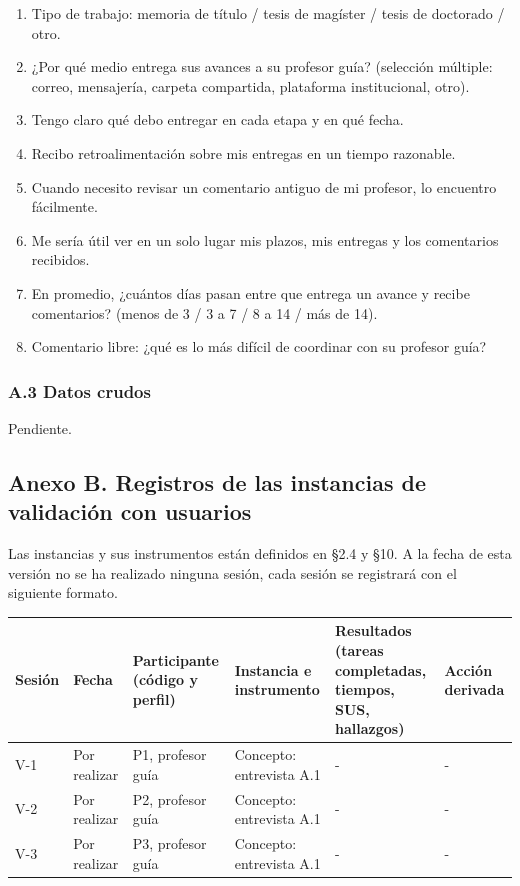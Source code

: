 \documentclass[10pt,a4paper]{article}
\newcommand{\hrow}{\rowcolor{encabezado}}
\newcommand{\h}[1]{\textbf{#1}}
\newcommand{\ph}[1]{{\color{nota}#1}}
\begin{document}
\begin{enumerate}[leftmargin=18pt,itemsep=1pt,topsep=2pt]
  \item Tipo de trabajo: memoria de título / tesis de magíster / tesis de doctorado / otro.
  \item ¿Por qué medio entrega sus avances a su profesor guía? (selección múltiple: correo, mensajería, carpeta compartida, plataforma institucional, otro).
  \item Tengo claro qué debo entregar en cada etapa y en qué fecha.
  \item Recibo retroalimentación sobre mis entregas en un tiempo razonable.
  \item Cuando necesito revisar un comentario antiguo de mi profesor, lo encuentro fácilmente.
  \item Me sería útil ver en un solo lugar mis plazos, mis entregas y los comentarios recibidos.
  \item En promedio, ¿cuántos días pasan entre que entrega un avance y recibe comentarios? (menos de 3 / 3 a 7 / 8 a 14 / más de 14).
  \item Comentario libre: ¿qué es lo más difícil de coordinar con su profesor guía?
\end{enumerate}

\subsubsection*{A.3 Datos crudos}
\ph{Pendiente.}

\subsection*{Anexo B. Registros de las instancias de validación con usuarios}
Las instancias y sus instrumentos están definidos en §2.4 y §10. A la fecha de esta versión no se ha realizado ninguna sesión, cada sesión se registrará con el siguiente formato.

\begin{xltabular}{\linewidth}{|P{1.2cm}|P{1.6cm}|P{2.0cm}|P{2.2cm}|L|P{2.4cm}|}
\hline\hrow \h{Sesión} & \h{Fecha} & \h{Participante (código y perfil)} & \h{Instancia e instrumento} & \h{Resultados (tareas completadas, tiempos, SUS, hallazgos)} & \h{Acción derivada} \\ \hline
\endhead
V-1 & \ph{Por realizar} & \ph{P1, profesor guía} & \ph{Concepto: entrevista A.1} & \ph{-} & \ph{-} \\ \hline
V-2 & \ph{Por realizar} & \ph{P2, profesor guía} & \ph{Concepto: entrevista A.1} & \ph{-} & \ph{-} \\ \hline
V-3 & \ph{Por realizar} & \ph{P3, profesor guía} & \ph{Concepto: entrevista A.1} & \ph{-} & \ph{-} \\ \hline
\end{xltabular}
\end{document}
